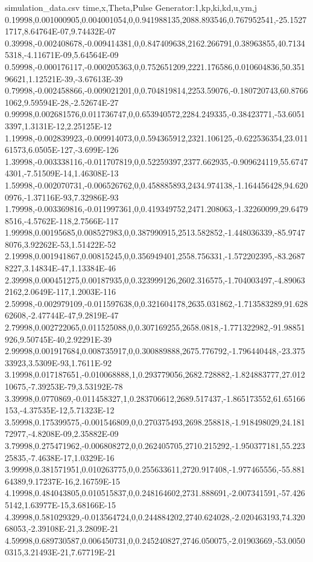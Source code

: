 \begin{filecontents}{simulation_data.csv}
time,x,Theta,Pulse Generator:1,kp,ki,kd,u,ym,j
0.19998,0.001000905,0.004001054,0,0.941988135,2088.893546,0.767952541,-25.15271717,8.64764E-07,9.74432E-07
0.39998,-0.002408678,-0.009414381,0,0.847409638,2162.266791,0.38963855,40.71345318,-4.11671E-09,5.64564E-09
0.59998,-0.000176117,-0.000205363,0,0.752651209,2221.176586,0.010604836,50.35196621,1.12521E-39,-3.67613E-39
0.79998,-0.002458866,-0.009021201,0,0.704819814,2253.59076,-0.180720743,60.87661062,9.59594E-28,-2.52674E-27
0.99998,0.002681576,0.011736747,0,0.653940572,2284.249335,-0.38423771,-53.60513397,1.3131E-12,2.25125E-12
1.19998,-0.002839923,-0.009914073,0,0.594365912,2321.106125,-0.622536354,23.01161573,6.0505E-127,-3.699E-126
1.39998,-0.003338116,-0.011707819,0,0.52259397,2377.662935,-0.909624119,55.67474301,-7.51509E-14,1.46308E-13
1.59998,-0.002070731,-0.006526762,0,0.458885893,2434.974138,-1.164456428,94.6200976,-1.37116E-93,7.32986E-93
1.79998,-0.003369816,-0.011997361,0,0.419349752,2471.208063,-1.32260099,29.64798516,-4.5762E-118,2.7566E-117
1.99998,0.00195685,0.008527983,0,0.387990915,2513.582852,-1.448036339,-85.97478076,3.92262E-53,1.51422E-52
2.19998,0.001941867,0.00815245,0,0.356949401,2558.756331,-1.572202395,-83.26878227,3.14834E-47,1.13384E-46
2.39998,0.000451275,0.00187935,0,0.323999126,2602.316575,-1.704003497,-4.890632162,2.0649E-117,1.2003E-116
2.59998,-0.002979109,-0.011597638,0,0.321604178,2635.031862,-1.713583289,91.62862608,-2.47744E-47,9.2819E-47
2.79998,0.002722065,0.011525088,0,0.307169255,2658.0818,-1.771322982,-91.98851926,9.50745E-40,2.92291E-39
2.99998,0.001917684,0.008735917,0,0.300889888,2675.776792,-1.796440448,-23.37533923,3.5309E-93,1.7611E-92
3.19998,0.017187651,-0.010068888,1,0.293779056,2682.728882,-1.824883777,27.01210675,-7.39253E-79,3.53192E-78
3.39998,0.0770869,-0.011458327,1,0.283706612,2689.517437,-1.865173552,61.65166153,-4.37535E-12,5.71323E-12
3.59998,0.175399575,-0.001546809,0,0.270375493,2698.258818,-1.918498029,24.18172977,-4.8208E-09,2.35882E-09
3.79998,0.275471962,-0.006808272,0,0.262405705,2710.215292,-1.950377181,55.22325835,-7.4638E-17,1.0329E-16
3.99998,0.381571951,0.010263775,0,0.255633611,2720.917408,-1.977465556,-55.88164389,9.17237E-16,2.16759E-15
4.19998,0.484043805,0.010515837,0,0.248164602,2731.888691,-2.007341591,-57.4265142,1.63977E-15,3.68166E-15
4.39998,0.581029329,-0.013564724,0,0.244884202,2740.624028,-2.020463193,74.32068053,-2.39108E-21,3.2809E-21
4.59998,0.689730587,0.006450731,0,0.245240827,2746.050075,-2.01903669,-53.00500315,3.21493E-21,7.67719E-21

\end{filecontents}
